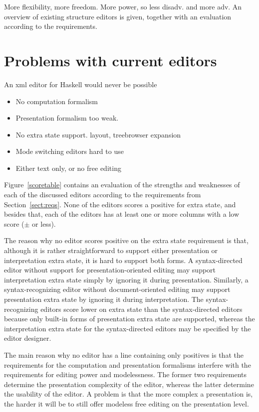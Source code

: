 \documentclass{speauth}
\begin{document}
 
\bc
More flexibility, more freedom. More power, so less disadv. and more adv. An overview of existing structure editors is given, together with an evaluation according to the requirements. 

\section{Problems with current editors}
An xml editor for Haskell would never be possible
\begin{itemize}
\item No computation formalism
\item Presentation formalism too weak. 
\item No extra state support. layout, treebrowser expansion
\item Mode switching editors hard to use
\item Either text only, or no free editing
\end{itemize}
\ec

Figure~\ref{scoretable} contains an evaluation of the strengths and weaknesses of each of the discussed editors according to the requirements from Section~\ref{sect:reqs}. None of the editors scores a positive for extra state, and besides that, each of the editors has at least one or more columns with a low score ($\pm$ or less). 

The reason why no editor scores positive on the extra state requirement is that, although it is rather straightforward to support either presentation or interpretation extra state, it is hard to support both forms. A syntax-directed editor without support for presentation-oriented editing may support interpretation extra state simply by ignoring it during presentation. Similarly, a syntax-recognizing editor without document-oriented editing may support presentation extra state by ignoring it during interpretation. The syntax-recognizing editors score lower on extra state than the syntax-directed editors because only built-in forms of presentation extra state are supported, whereas the interpretation extra state for the syntax-directed editors may be specified by the editor designer.

The main reason why no editor has a line containing only positives is that the requirements for the computation and presentation formalisms interfere with the requirements for editing power and modelessness. The former two requirements determine the presentation complexity of the editor, whereas the latter determine the usability of the editor. A problem is that the more complex a presentation is, the harder it will be to still offer modeless free editing on the presentation level.
\end{document}
